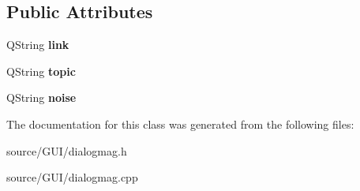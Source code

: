 \subsection*{Public Attributes}
\begin{DoxyCompactItemize}
\item 
Q\+String {\bfseries link}\label{class_dialog_mag_a4825dae85a8303cfac08720c8b716307}

\item 
Q\+String {\bfseries topic}\label{class_dialog_mag_a4f58508a01005febfb4852a1935b4b20}

\item 
Q\+String {\bfseries noise}\label{class_dialog_mag_a1fea7bb510e974d42bb92df80a4694a4}

\end{DoxyCompactItemize}


The documentation for this class was generated from the following files\+:\begin{DoxyCompactItemize}
\item 
source/\+G\+U\+I/dialogmag.\+h\item 
source/\+G\+U\+I/dialogmag.\+cpp\end{DoxyCompactItemize}
